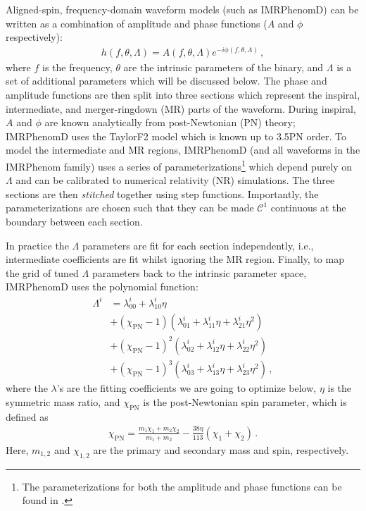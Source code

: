 \documentclass[twocolumn]{aastex631}
\begin{document}
Aligned-spin, frequency-domain waveform models (such as IMRPhenomD) can be written as a
combination of amplitude and phase functions ($A$ and $\phi$ respectively):
\begin{align}\label{eq:}
	h(f,\theta,\Lambda) = A(f,\theta,\Lambda)e^{-i\phi(f,\theta,\Lambda)}\,,
\end{align}
where $f$ is the frequency, $\theta$ are the intrinsic parameters of the binary, and $\Lambda$ is a set of additional
parameters which will be discussed below. 
The phase and amplitude functions are then split into three sections which represent the
inspiral, intermediate, and merger-ringdown (MR) parts of the waveform. 
During inspiral, $A$ and $\phi$ are known analytically from post-Newtonian (PN) theory;
IMRPhenomD uses the TaylorF2 model \citep{Buonanno:2009zt, Arun:2004hn} which is known up to 3.5PN order.
To model the intermediate and MR regions, IMRPhenomD (and all waveforms in the IMRPhenom family)
uses a series of parameterizations\footnote{
	The parameterizations for both the amplitude and phase functions can be found in \citep{khan2016frequency}.
} 
which depend purely on $\Lambda$ and can be calibrated to numerical relativity (NR) simulations.
The three sections are then \textit{stitched} together using step functions.
Importantly, the parameterizations are chosen such that they can be made $\mathcal{C}^1$ continuous at the
boundary between each section.

In practice the $\Lambda$ parameters are fit for each section independently, i.e., intermediate coefficients are fit whilst ignoring the MR region.
Finally, to map the grid of tuned $\Lambda$ parameters back to the intrinsic parameter space, IMRPhenomD uses the polynomial function:
\begin{align} \label{eq:Lambda}
	\Lambda^i&=\lambda_{00}^i+\lambda_{10}^i\eta \nonumber \\
	&+(\chi_{\mathrm{PN}}-1)(\lambda_{01}^i+\lambda_{11}^i\eta+\lambda_{21}^i\eta^2) \nonumber \\ 
	&+(\chi_{\mathrm{PN}}-1)^2(\lambda_{02}^i+\lambda_{12}^i\eta+\lambda_{22}^i\eta^2) \nonumber \\
	&+(\chi_{\mathrm{PN}}-1)^3(\lambda_{03}^i+\lambda_{13}^i\eta+\lambda_{23}^i\eta^2)\,,
\end{align}
where the $\lambda$'s are the fitting coefficients we are going to optimize below, $\eta$ is
the symmetric mass ratio, and $\chi_{\mathrm{PN}}$ is the post-Newtonian spin
parameter, which is defined as 
\begin{align}
	\chi_{\mathrm{PN}}=\frac{m_1\chi_1+m_2\chi_2}{m_1+m_2}-\frac{38\eta}{113}(\chi_1+\chi_2)\,.
\end{align}
Here, $m_{1,2}$ and $\chi_{1,2}$ are the primary and secondary mass and spin,
respectively. 
\end{document}
